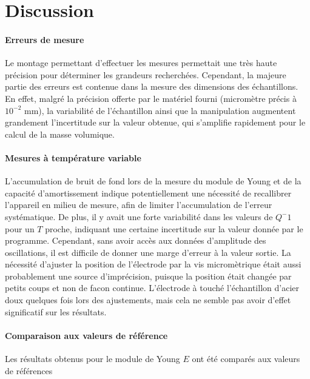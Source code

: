 \section{Discussion}

\paragraph{Erreurs de mesure} Le montage permettant d'effectuer les mesures permettait une très haute précision pour déterminer les grandeurs recherchées. Cependant, la majeure partie des erreurs est contenue dans la mesure des dimensions des échantillons. En effet, malgré la précision offerte par le matériel fourni (micromètre précis à \(10^{-2}\) \si{\milli\meter}), la variabilité de l'échantillon ainsi que la manipulation augmentent grandement l'incertitude sur la valeur obtenue, qui s'amplifie rapidement pour le calcul de la masse volumique.

\paragraph{Mesures à température variable} L'accumulation de bruit de fond lors de la mesure du module de Young et de la capacité d'amortissement indique potentiellement une nécessité de recallibrer l'appareil en milieu de mesure, afin de limiter l'accumulation de l'erreur systématique. De plus, il y avait une forte variabilité dans les valeurs de \(Q^-1\) pour un \(T\) proche, indiquant une certaine incertitude sur la valeur donnée par le programme. Cependant, sans avoir accès aux données d'amplitude des oscillations, il est difficile de donner une marge d'erreur à la valeur sortie. La nécessité d'ajuster la position de l'électrode par la vis micromètrique était aussi probablement une source d'imprécision, puisque la position était changée par petits coups et non de facon continue. L'électrode à touché l'échantillon d'acier doux quelques fois lors des ajustements, mais cela ne semble pas avoir d'effet significatif sur les résultats.

\paragraph{Comparaison aux valeurs de référence} Les résultats obtenus pour le module de Young \(E\) ont été comparés aux valeurs de références
